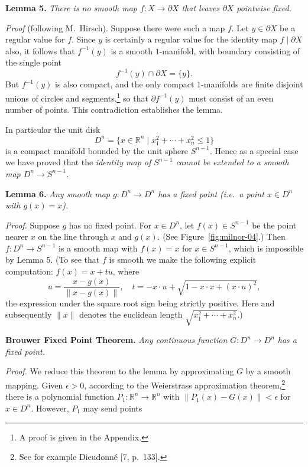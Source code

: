 
\noindent\textbf{Lemma 5.} \textit{There is no smooth map $f : X \to \partial X$ that leaves $\partial X$ pointwise fixed.}

\noindent\textit{Proof} (following M.~Hirsch). Suppose there were such a map $f$. Let $y \in \partial X$ be a regular value for $f$. Since $y$ is certainly a regular value for the identity map $f \mid \partial X$ also, it follows that $f^{-1}(y)$ is a smooth $1$-manifold, with boundary consisting of the single point
\[
f^{-1}(y) \cap \partial X = \{y\}.
\]
But $f^{-1}(y)$ is also compact, and the only compact $1$-manifolds are finite disjoint unions of circles and segments,\footnote{A proof is given in the Appendix.} so that $\partial f^{-1}(y)$ must consist of an even number of points. This contradiction establishes the lemma.

In particular the unit disk
\[
D^n = \{x \in \mathbb{R}^n \mid x_1^2 + \cdots + x_n^2 \leq 1\}
\]
is a compact manifold bounded by the unit sphere $S^{n-1}$. Hence as a special case we have proved that the \emph{identity map of $S^{n-1}$ cannot be extended to a smooth map $D^n \to S^{n-1}$.}

\noindent\textbf{Lemma 6.} \textit{Any smooth map $g : D^n \to D^n$ has a fixed point (i.e.\ a point $x \in D^n$ with $g(x) = x$).}

\noindent\textit{Proof.} Suppose $g$ has no fixed point. For $x \in D^n$, let $f(x) \in S^{n-1}$ be the point nearer $x$ on the line through $x$ and $g(x)$. (See Figure~\ref{fig:milnor-04}.) Then $f : D^n \to S^{n-1}$ is a smooth map with $f(x) = x$ for $x \in S^{n-1}$, which is impossible by Lemma 5. (To see that $f$ is smooth we make the following explicit computation: $f(x) = x + tu$, where
\[
u = \frac{x - g(x)}{\|x - g(x)\|}, \quad t = -x \cdot u + \sqrt{1 - x \cdot x + (x \cdot u)^2},
\]
the expression under the square root sign being strictly positive. Here and subsequently $\|x\|$ denotes the euclidean length $\sqrt{x_1^2 + \cdots + x_n^2}$.)

\noindent\textbf{Brouwer Fixed Point Theorem.} \textit{Any continuous function $G : D^n \to D^n$ has a fixed point.}

\noindent\textit{Proof.} We reduce this theorem to the lemma by approximating $G$ by a smooth mapping. Given $\epsilon > 0$, according to the Weierstrass approximation theorem,\footnote{See for example Dieudonn\'e [7, p.~133].} there is a polynomial function $P_1 : \mathbb{R}^n \to \mathbb{R}^n$ with $\|P_1(x) - G(x)\| < \epsilon$ for $x \in D^n$. However, $P_1$ may send points


